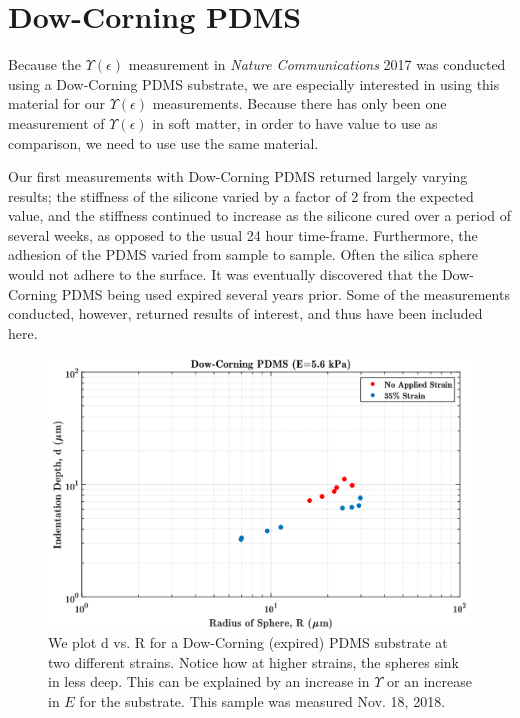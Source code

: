 \section{Dow-Corning PDMS}
Because the $ \Upsilon(\epsilon) $ measurement in \textit{Nature Communications} 2017 \cite{xu2017direct} was conducted using a Dow-Corning PDMS substrate, we are especially interested in using this material for our $ \Upsilon(\epsilon) $ measurements. Because there has only been one measurement of $ \Upsilon(\epsilon) $ in soft matter, in order to have value to use as comparison, we need to use use the same material. 

Our first measurements with Dow-Corning PDMS returned largely varying results; the stiffness of the silicone varied by a factor of 2 from the expected value, and the stiffness continued to increase as the silicone cured over a period of several weeks, as opposed to the usual 24 hour time-frame. Furthermore, the adhesion of the PDMS varied from sample to sample. Often the silica sphere would not adhere to the surface. It was eventually discovered that the Dow-Corning PDMS being used expired several years prior. Some of the measurements conducted, however, returned results of interest, and thus have been included here.


\begin{figure}[h]
	\centering
	\includegraphics[width=\linewidth]{Chapters/Figures/d_vs_r_stretch_vs_nostretch.pdf}
	\caption[D vs. R Dow-Corning]{We plot d vs. R for a Dow-Corning (expired) PDMS substrate at two different strains. Notice how at higher strains, the spheres sink in less deep. This can be explained by an increase in $\Upsilon$ or an increase in $E$ for the substrate. This sample was measured Nov. 18, 2018.}
	\label{fig:dvsrstretchvsnostretchdc181115}
\end{figure}

